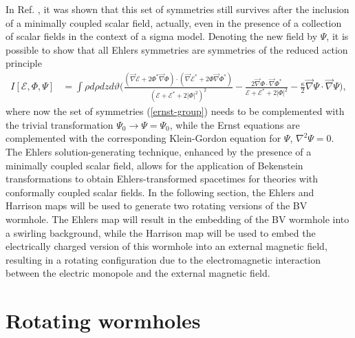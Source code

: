 \documentclass[aps,preprint,groupedaddress,nofootinbib,superscriptaddress,showkeys,showpacs,eqsecnum,amsmath,amssymb]{revtex4-1}
\newcommand{\ernst}{\mathcal{E}}
\begin{document}
In Ref. \cite{Astorino:2013xc}, it was shown that this set of symmetries still survives after the inclusion of a minimally coupled scalar field, actually, even in the presence of a collection of scalar fields in the context of a sigma model. Denoting the new field by $\Psi$, it is possible to show that all Ehlers symmetries are symmetries of the reduced action principle 
\begin{align}
I[\ernst,\Phi,\Psi] &= \int \rho d\rho dz d\vartheta \Biggl(\frac{(\vec{\nabla}\ernst + 2 \Phi^{*} \vec{\nabla} \Phi ) \cdot (\vec{\nabla}\ernst^{*} + 2 \Phi \vec{\nabla} \Phi^{*} )}{(\ernst+ \ernst^{*} + 2 |\Phi|^2)^2}-\frac{2 \vec{\nabla}\Phi \cdot \vec{\nabla}\Phi^{*}}{\ernst + \ernst^{*} + 2 |\Phi|^2} -\frac{\kappa}{2} \vec{\nabla}\Psi \cdot \vec{\nabla} \Psi \Biggr) , \label{maxw-GR+MinScl-action}
\end{align}
where now the set of symmetries (\ref{ernst-group}) needs to be complemented with the trivial transformation $\Psi_0\rightarrow\Psi=\Psi_0$, while the Ernst equations are complemented with the corresponding Klein-Gordon equation for $\Psi$, $\nabla^2\Psi=0$. 
The Ehlers solution-generating technique, enhanced by the presence of a minimally coupled scalar field, allows for the application of Bekenstein transformations to obtain Ehlers-transformed spacetimes for theories with conformally coupled scalar fields. In the following section, the Ehlers and Harrison maps will be used to generate two rotating versions of the BV wormhole. The Ehlers map will result in the embedding of the BV wormhole into a swirling background, while the Harrison map will be used to embed the electrically charged version of this wormhole into an external magnetic field, resulting in a rotating configuration due to the electromagnetic interaction between the electric monopole and the external magnetic field.

\section{Rotating wormholes\label{sec:RotWH}}
\end{document}
